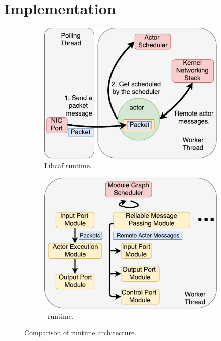 \section{Implementation}
 \label{sec:nfvactor-implementation}

\begin{figure}[!h]
\begin{subfigure}[t]{0.49\linewidth}
   \centering
   \includegraphics[width=\columnwidth]{chap-nfvactor/figure/actor-scheduling.pdf}
   \caption{Libcaf runtime.}\label{fig:actor-schedule}
  \end{subfigure}
  \begin{subfigure}[t]{0.49\linewidth}
     \centering
     \includegraphics[width=\columnwidth]{chap-nfvactor/figure/graph-scheduling.pdf}
     \caption{\nfactor~runtime.}\label{fig:graph-schedule}
    \end{subfigure}
 \caption{Comparison of runtime architecture.}
\label{fig:two-versions}
\end{figure}

